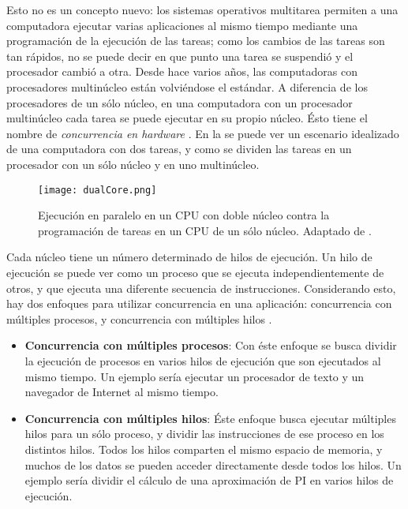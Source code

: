 Esto no es un concepto nuevo: los sistemas operativos multitarea permiten a una computadora ejecutar varias aplicaciones al mismo tiempo mediante una programación de la ejecución de las tareas; como los cambios de las tareas son tan rápidos, no se puede decir en que punto una tarea se suspendió y el procesador cambió a otra. Desde hace varios años, las computadoras con procesadores multinúcleo están volviéndose el estándar. A diferencia de los procesadores de un sólo núcleo, en una computadora con un procesador multinúcleo cada tarea se puede ejecutar en su propio núcleo. Ésto tiene el nombre de \textit{concurrencia en hardware} \citep{williams2012c}. En la  se puede ver un escenario idealizado de una computadora con dos tareas, y como se dividen las tareas en un procesador con un sólo núcleo y en uno multinúcleo.

\begin{figure}
	\centering
		\texttt{[image: dualCore.png]}
	\caption[Enfoques distintos de concurrencia en CPUs.]{Ejecución en paralelo en un CPU con doble núcleo contra la programación de tareas en un CPU de un sólo núcleo. Adaptado de \citep{williams2012c}.}
		\label{fig:dualCore}
\end{figure}

Cada núcleo tiene un número determinado de hilos de ejecución. Un hilo de ejecución se puede ver como un proceso que se ejecuta independientemente de otros, y que ejecuta una diferente secuencia de instrucciones. Considerando esto, hay dos enfoques para utilizar concurrencia en una aplicación: concurrencia con múltiples procesos, y concurrencia con múltiples hilos \citep{williams2012c}.

\begin{itemize}
	\item \textbf{Concurrencia con múltiples procesos}: Con éste enfoque se busca dividir la ejecución de procesos en varios hilos de ejecución que son ejecutados al mismo tiempo. Un ejemplo sería ejecutar un procesador de texto y un navegador de Internet al mismo tiempo.
	\item \textbf{Concurrencia con múltiples hilos}: Éste enfoque busca ejecutar múltiples hilos para un sólo proceso, y dividir las instrucciones de ese proceso en los distintos hilos. Todos los hilos comparten el mismo espacio de memoria, y muchos de los datos se pueden acceder directamente desde todos los hilos. Un ejemplo sería dividir el cálculo de una aproximación de PI en varios hilos de ejecución.
\end{itemize}

